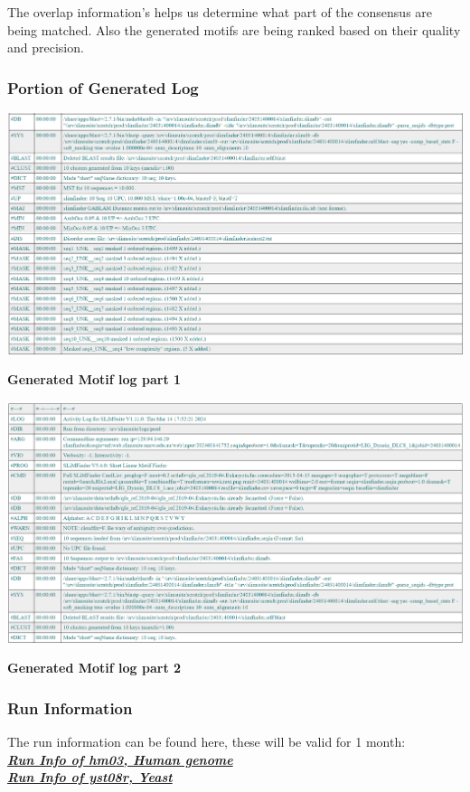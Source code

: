 The overlap information's helps us determine what part of the consensus are being matched. Also the generated motifs are being ranked based on their quality and precision.

\subsubsection{Portion of Generated Log}

\vspace{8pt}
\begin{center}
\includegraphics[width=14cm]{images/log1.png}
\end{center}
\begin{center}
\textbf{Generated Motif log part 1}
\end{center}
\vspace{8pt}

\vspace{8pt}
\begin{center}
\includegraphics[width=14cm]{images/log2.png}
\end{center}
\begin{center}
\textbf{Generated Motif log part 2}
\end{center}
\vspace{8pt}

\subsubsection{Run Information}
The run information can be found here, these will be valid for 1 month:\\
\href{http://rest.slimsuite.unsw.edu.au/retrieve&jobid=24031400014&rest=format&password=None&refresh=4}{\textit{\textbf{Run Info of hm03, Human genome}}}
\\
\href{http://rest.slimsuite.unsw.edu.au/retrieve&jobid=24031400017&rest=format&password=None&refresh=4}{\textit{\textbf{Run Info of yst08r, Yeast}}}